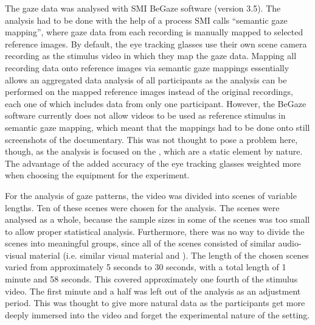 \documentclass[output=paper]{langsci/langscibook}
\begin{document}
The gaze data was analysed with SMI BeGaze software (version 3.5). The analysis had to be done with the help of a process SMI calls ``semantic gaze mapping'', where gaze data from each recording is manually mapped to selected reference images. By default, the eye tracking glasses use their own scene camera recording as the stimulus video in which they map the gaze data. Mapping all recording data onto reference images via semantic gaze mappings essentially allows an aggregated data analysis of all participants as the analysis can be performed on the mapped reference images instead of the original recordings, each one of which includes data from only one participant. However, the BeGaze software currently does not allow videos to be used as reference stimulus in semantic gaze mapping, which meant that the mappings had to be done onto still screenshots of the documentary. This was not thought to pose a problem here, though, as the analysis is focused on the , which are a static element by nature. The advantage of the added accuracy of the eye tracking glasses weighted more when choosing the equipment for the experiment.

For the analysis of gaze patterns, the video was divided into scenes of variable lengths. Ten of these scenes were chosen for the analysis. The scenes were analysed as a whole, because the sample sizes in some of the scenes was too small to allow proper statistical analysis. Furthermore, there was no way to divide the scenes into meaningful groups, since all of the scenes consisted of similar audio-visual material (i.e. similar visual material and ). The length of the chosen scenes varied from approximately 5 seconds to 30 seconds, with a total length of 1 minute and 58 seconds. This covered approximately one fourth of the stimulus video. The first minute and a half was left out of the analysis as an adjustment period. This was thought to give more natural data as the participants get more deeply immersed into the video and forget the experimental nature of the setting. 
\end{document}
